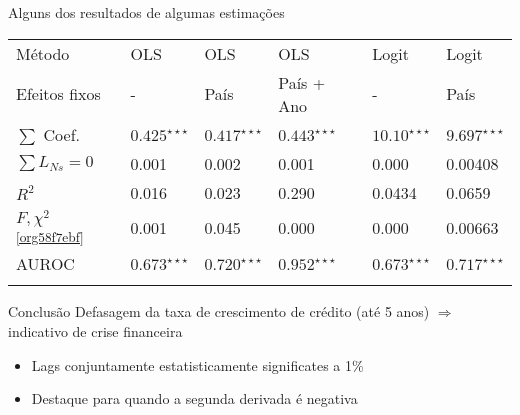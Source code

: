 \documentclass[presentation]{beamer}
\begin{document}
\begin{frame}[label={sec:orgbae1cf5}]{Alguns dos resultados de algumas estimações}
\begin{center}
\begin{center}
\begin{tabular}{llllll}
\hline
Método & OLS & OLS & OLS & Logit & Logit\\
Efeitos fixos & - & País & País + Ano & - & País\\
\hline
\(\sum\) Coef. & \(0.425^{\star\star\star}\) & \(0.417^{\star\star\star}\) & \(0.443^{\star\star\star}\) & \(10.10^{\star\star\star}\) & \(9.697^{\star\star\star}\)\\
\(\sum L_{Ns} = 0\)\footnotemark & 0.001 & 0.002 & 0.001 & 0.000 & 0.00408\\
\(R^2\) & 0.016 & 0.023 & 0.290 & 0.0434 & 0.0659\\
\(F, \chi^{2}\)\textsuperscript{\ref{org58f7ebf}} & 0.001 & 0.045 & 0.000 & 0.000 & 0.00663\\
AUROC & \(0.673^{\star\star\star}\) & \(0.720^{\star\star\star}\) & \(0.952^{\star\star\star}\) & \(0.673^{\star\star\star}\) & \(0.717^{\star\star\star}\)\\
\hline
 &  &  &  &  & \\
\end{tabular}
\end{center}
\end{center}


\begin{block}{Conclusão}
Defasagem da taxa de crescimento de crédito (até 5 anos) \(\Rightarrow\) indicativo de crise financeira
\begin{itemize}
\item Lags conjuntamente estatisticamente significates a 1\%
\item Destaque para quando a segunda derivada é negativa
\end{itemize}
\end{block}
\end{frame}
\end{document}
